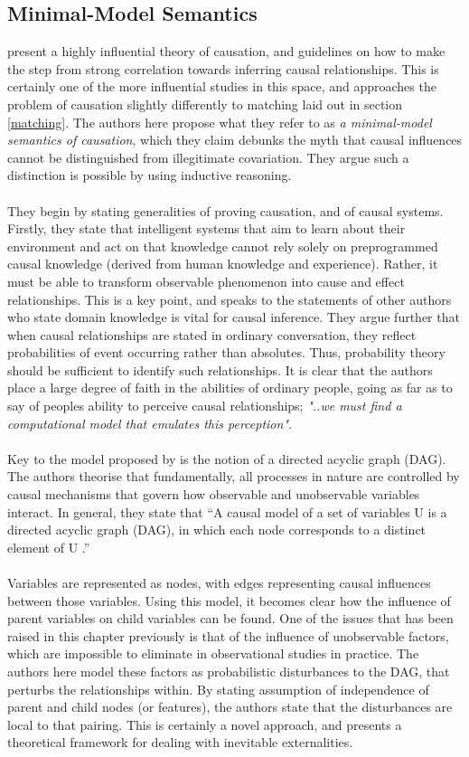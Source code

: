 \subsection{Minimal-Model Semantics}
{\cite{pearl1995theory} present a highly influential theory of causation, and guidelines on how to make the step from strong correlation towards inferring causal relationships. This is certainly one of the more influential studies in this space, and approaches the problem of causation slightly differently to matching laid out in section \ref{matching}. The authors here propose what they refer to as {\it a minimal-model semantics of causation}, which they claim debunks the myth that causal influences cannot be distinguished from illegitimate covariation. They argue such a distinction is possible by using inductive reasoning.\\\\
They begin by stating generalities of proving causation, and of causal systems. Firstly, they state that intelligent systems that aim to learn about their environment and act on that knowledge cannot rely solely on preprogrammed causal knowledge (derived from human knowledge and experience). Rather, it must be able to transform observable phenomenon into cause and effect relationships. This is a key point, and speaks to the statements of other authors who state domain knowledge is vital for causal inference. They argue further that when causal relationships are stated in ordinary conversation, they reflect probabilities of event occurring rather than absolutes. Thus, probability theory should be sufficient to identify such relationships. It is clear that the authors place a large degree of faith in the abilities of ordinary people, going as far as to say of peoples ability to perceive causal relationships; {\it "..we must find a computational model that emulates this perception"}.\\\\
Key to the model proposed by \cite{pearl1995theory} is the notion of a directed acyclic graph (DAG). The authors theorise that fundamentally, all processes in nature are controlled by causal mechanisms that govern how observable and unobservable variables interact. In general, they state that
``A causal model of a set of variables U is a directed acyclic graph (DAG), in which each node corresponds to a distinct element of U \cite {pearl1995theory}.'' \\\\
Variables are represented as nodes, with edges representing causal influences between those variables. Using this model, it becomes clear how the influence of parent variables on child variables can be found. One of the issues that has been raised in this chapter previously is that of the influence of unobservable factors, which are impossible to eliminate in observational studies in practice. The authors here model these factors as probabilistic disturbances to the DAG, that perturbs the relationships within. By stating assumption of independence of parent and child nodes (or features), the authors state that the disturbances are local to that pairing. This is certainly a novel approach, and presents a theoretical framework for dealing with inevitable externalities.\\\\
}
